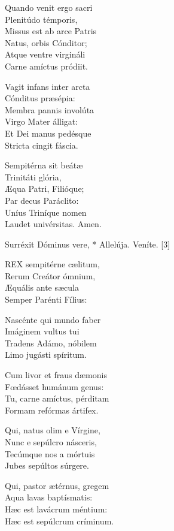 Quando venit ergo sacri\\
Plenitúdo témporis,\\
Missus est ab arce Patris\\
Natus, orbis Cónditor;\\
Atque ventre virgináli\\
Carne amíctus pródiit.

Vagit infans inter arcta\\
Cónditus præsépia:\\
Membra pannis involúta\\
Virgo Mater álligat:\\
Et Dei manus pedésque\\
Stricta cingit fáscia.

Sempitérna sit beátæ\\
Trinitáti glória,\\
Æqua Patri, Filióque;\\
Par decus Paráclito:\\
Uníus Triníque nomen\\
Laudet univérsitas. Amen.


 Surréxit Dóminus vere, * Allelúja.  Veníte. [3]


\lettrine[lines=2]{R}{EX} sempitérne cælitum,\\
Rerum Creátor ómnium,\\
Æquális ante sæcula\\
Semper Parénti Fílius:

Nascénte qui mundo faber\\
Imáginem vultus tui\\
Tradens Adámo, nóbilem\\
Limo jugásti spíritum.

Cum livor et fraus dæmonis\\
Fœdásset humánum genus:\\
Tu, carne amíctus, pérditam\\
Formam refórmas ártifex.

Qui, natus olim e Vírgine,\\
Nunc e sepúlcro násceris,\\
Tecúmque nos a mórtuis\\
Jubes sepúltos súrgere.

Qui, pastor ætérnus, gregem\\
Aqua lavas baptísmatis:\\
Hæc est lavácrum méntium:\\
Hæc est sepúlcrum críminum.

